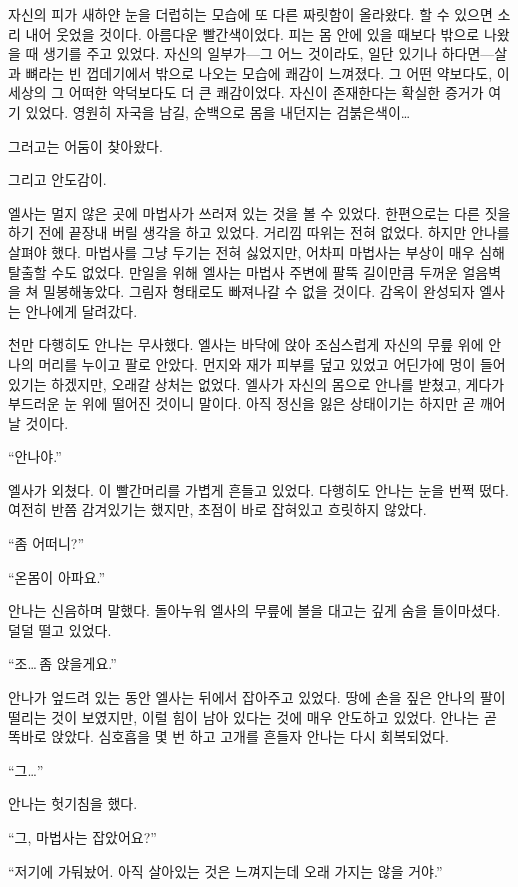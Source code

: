 자신의 피가 새하얀 눈을 더럽히는 모습에 또 다른 짜릿함이 올라왔다. 할 수 있으면 소리 내어 웃었을 것이다. 아름다운 빨간색이었다. 피는 몸 안에 있을 때보다 밖으로 나왔을 때 생기를 주고 있었다. 자신의 일부가—그 어느 것이라도, 일단 있기나 하다면—살과 뼈라는 빈 껍데기에서 밖으로 나오는 모습에 쾌감이 느껴졌다. 그 어떤 약보다도, 이 세상의 그 어떠한 악덕보다도 더 큰 쾌감이었다. 자신이 존재한다는 확실한 증거가 여기 있었다. 영원히 자국을 남길, 순백으로 몸을 내던지는 검붉은색이\ldots

그러고는 어둠이 찾아왔다.

그리고 안도감이.

\textbreak

엘사는 멀지 않은 곳에 마법사가 쓰러져 있는 것을 볼 수 있었다. 한편으로는 다른 짓을 하기 전에 끝장내 버릴 생각을 하고 있었다. 거리낌 따위는 전혀 없었다. 하지만 안나를 살펴야 했다. 마법사를 그냥 두기는 전혀 싫었지만, 어차피 마법사는 부상이 매우 심해 탈출할 수도 없었다. 만일을 위해 엘사는 마법사 주변에 팔뚝 길이만큼 두꺼운 얼음벽을 쳐 밀봉해놓았다. 그림자 형태로도 빠져나갈 수 없을 것이다. 감옥이 완성되자 엘사는 안나에게 달려갔다.

천만 다행히도 안나는 무사했다. 엘사는 바닥에 앉아 조심스럽게 자신의 무릎 위에 안나의 머리를 누이고 팔로 안았다. 먼지와 재가 피부를 덮고 있었고 어딘가에 멍이 들어 있기는 하겠지만, 오래갈 상처는 없었다. 엘사가 자신의 몸으로 안나를 받쳤고, 게다가 부드러운 눈 위에 떨어진 것이니 말이다. 아직 정신을 잃은 상태이기는 하지만 곧 깨어날 것이다.

``안나야.''

엘사가 외쳤다. 이 빨간머리를 가볍게 흔들고 있었다. 다행히도 안나는 눈을 번쩍 떴다. 여전히 반쯤 감겨있기는 했지만, 초점이 바로 잡혀있고 흐릿하지 않았다.

``좀 어떠니?''

``온몸이 아파요.''

안나는 신음하며 말했다. 돌아누워 엘사의 무릎에 볼을 대고는 깊게 숨을 들이마셨다. 덜덜 떨고 있었다.

``조\ldots\,좀 앉을게요.''

안나가 엎드려 있는 동안 엘사는 뒤에서 잡아주고 있었다. 땅에 손을 짚은 안나의 팔이 떨리는 것이 보였지만, 이럴 힘이 남아 있다는 것에 매우 안도하고 있었다. 안나는 곧 똑바로 앉았다. 심호흡을 몇 번 하고 고개를 흔들자 안나는 다시 회복되었다.

``그\ldots''

안나는 헛기침을 했다.

``그, 마법사는 잡았어요?''

``저기에 가둬놨어. 아직 살아있는 것은 느껴지는데 오래 가지는 않을 거야.''

